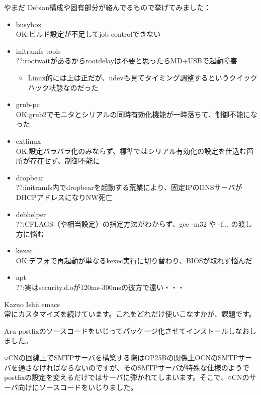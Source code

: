 \begin{prework}{ やまだ }
Debian構成や固有部分が絡んでるもので挙げてみました：
\begin{itemize}
\item busybox\\
OK:ビルド設定が不足してjob controlできない
\item initramfs-tools\\
??:rootwaitがあるからrootdelayは不要と思ったらMD+USBで起動障害
\begin{itemize}
\item Linux的には上は正だが、udevも見てタイミング調整するというクイックハック状態なのだった
\end{itemize}
\item grub-pc\\
OK:grub2でモニタとシリアルの同時有効化機能が一時落ちて、制御不能になった
\end{itemize}
\begin{itemize}
\item extlinux\\
OK:設定バラバラ化のみならず、標準ではシリアル有効化の設定を仕込む箇所が存在せず、制御不能に
\item dropbear\\
??:initramfs内でdropbearを起動する荒業により、固定IPのDNSサーバがDHCPアドレスになりNW死亡
\item debhelper\\
??:CFLAGS（や相当設定）の指定方法がわからず、gcc -m32 や -f... の渡し方に悩む
\item kexec\\
OK:デフォで再起動が単なるkexec実行に切り替わり、BIOSが取れず悩んだ
\item apt\\
??:実はsecurity.d.oが120ms-300msの彼方で遠い・・・
\end{itemize}
\end{prework}

\begin{prework}{ Kazuo Ishii }
emacs\\常にカスタマイズを続けています。これをどれだけ使いこなすかが、課題です。
\end{prework}

\begin{prework}{ Aru }
postfixのソースコードをいじってパッケージ化させてインストールしなおしました。

○CNの回線上でSMTPサーバを構築する際はOP25Bの関係上OCNのSMTPサーバを通さなければならないのですが、そのSMTPサーバが特殊な仕様のようでpostfixの設定を変えるだけではサーバに弾かれてしまいます。そこで、○CNのサーバ向けにソースコードをいじりました。
\end{prework}

